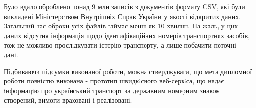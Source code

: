 Було вдало оброблено понад 9 млн записів з документів формату CSV,
які були викладені Міністерством Внутрішніх Справ України у якості відкритих даних.
Загальний час оброки усіх файлів займає менш як 10 хвилин.
На жаль, у цих даних відсутня інформація щодо ідентифікаційних
номерів транспортних засобів, тож не можливо
прослідкувати історію транспорту, а лише побачити поточні дані.

Підбиваючи підсумки виконаної роботи, можна стверджувати, що мета
дипломної роботи повністю виконана - прототип швидкiсного веб-сервiса,
що надає iнформацiю про український транспорт за державним номерним знаком створений,
вимоги враховані і реалізовані.